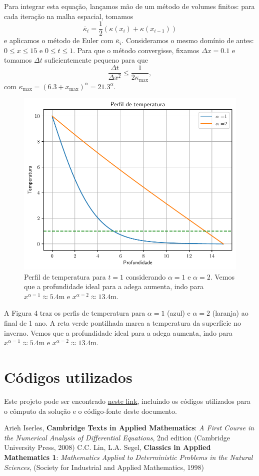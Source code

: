 \documentclass[twocolumn,showpacs,%
  nofootinbib,aps,superscriptaddress,%
  eqsecnum,prd,notitlepage,showkeys,10pt]{revtex4-1} %
\renewcommand{\leq}{\leqslant}
\begin{document}
	Para integrar esta equação, lançamos mão de um método de volumes finitos: para cada iteração na malha espacial,
	tomamos
	\begin{equation}
		\overline{\kappa}_i = \frac{1}{2}\left( \kappa(x_{i}) + \kappa(x_{i-1}) \right)
	\end{equation}
	e aplicamos o método de Euler com $\overline{\kappa}_i$. Consideramos o mesmo domínio de antes: $0 \leq x \leq 15$ e $0 \leq t \leq 1$.
	Para que o método convergisse, fixamos $\Delta x = 0.1$ e tomamos
	$\Delta t$ suficientemente pequeno para que
	\begin{equation}
		\frac{\Delta t}{\Delta x^2} \leq \frac{1}{2\kappa_{\max}},
	\end{equation}
	com $\kappa_{\max} = {(6.3 + x_{\max})}^{\alpha} = 21.3^{\alpha}$.
	\begin{figure}[t]%
		\label{fig:FVM}
		\includegraphics[width=.45\textwidth]{Codes/FVM.pdf}
		\caption{Perfil de temperatura para $t=1$ considerando $\alpha = 1$ e $\alpha = 2$.
		Vemos que a profundidade ideal para a adega aumenta, indo para $x^{\alpha=1} \approx 5.4$m
		e $x^{\alpha=2} \approx 13.4$m.}
	\end{figure}
	A Figura 4 traz os perfis de temperatura para $\alpha=1$ (azul)
	e $\alpha = 2$ (laranja) ao final de 1 ano. A reta verde pontilhada marca a temperatura da superfície no inverno.
	Vemos que a profundidade ideal para a adega aumenta, indo para $x^{\alpha=1} \approx 5.4$m
	e $x^{\alpha=2} \approx 13.4$m.
%
\section{Códigos utilizados}
%
	Este projeto pode ser encontrado
	\href{https://github.com/CaioTomas/Trabalho-IMCEDP}{neste link},
	incluindo os códigos utilizados para o cômputo da solução e o código-fonte
	deste documento.


% 

\begin{thebibliography}{9}
	 Arieh Iserles, \textbf{Cambridge Texts in Applied Mathematics}: \textit{A First Course in the Numerical Analysis of Differential Equations}, 2nd edition (Cambridge University Press, 2008)
	 C.C. Lin, L.A. Segel, \textbf{Classics in Applied Mathematics 1}: \textit{Mathematics Applied to Deterministic Problems in the Natural Sciences}, (Society for Industrial and Applied Mathematics, 1998)
\end{thebibliography}
\end{document}
